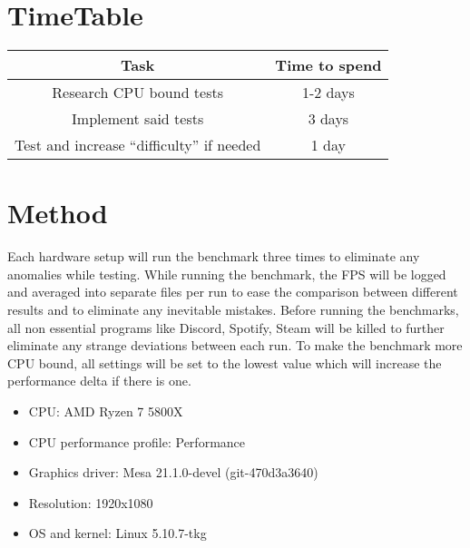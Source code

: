 \documentclass{article}
\begin{document}
\section {TimeTable}
\begin{center}
\begin{tabular}{ |c|c| }
 \hline
    \textbf {Task} & \textbf {Time to spend} \\ [0.5ex]
 \hline\hline
    Research CPU bound tests & 1-2 days \\
    \hline
    Implement said tests & 3 days \\
    \hline
    Test and increase “difficulty” if needed & 1 day \\
 \hline
\end{tabular}
\end{center}


\section {Method}
Each hardware setup will run the benchmark three times to eliminate any anomalies while testing. While running the benchmark, the FPS will be logged and averaged into separate files per run to ease the comparison between different results and to eliminate any inevitable mistakes. Before running the benchmarks, all non essential programs like Discord, Spotify, Steam will be killed to further eliminate any strange deviations between each run. To make the benchmark more CPU bound, all settings will be set to the lowest value which will increase the performance delta if there is one.

\begin{itemize}
    \item CPU: AMD Ryzen 7 5800X
    \item CPU performance profile: Performance
    \item Graphics driver: Mesa 21.1.0-devel (git-470d3a3640)
    \item Resolution: 1920x1080
    \item OS and kernel: Linux 5.10.7-tkg
\end{itemize}


\printbibliography
\end{document}
